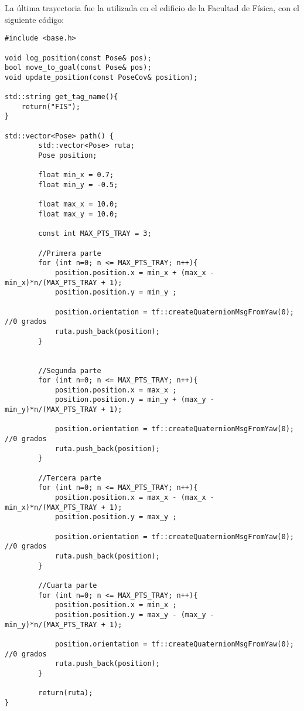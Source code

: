 La última trayectoria fue la utilizada en el edificio de la Facultad de Física, con el siguiente código:
\begin{lstlisting}
#include <base.h>

void log_position(const Pose& pos);
bool move_to_goal(const Pose& pos);
void update_position(const PoseCov& position);

std::string get_tag_name(){
    return("FIS");
}

std::vector<Pose> path() {
        std::vector<Pose> ruta;
        Pose position;

        float min_x = 0.7;
        float min_y = -0.5;

        float max_x = 10.0;
        float max_y = 10.0;

        const int MAX_PTS_TRAY = 3;

        //Primera parte
        for (int n=0; n <= MAX_PTS_TRAY; n++){
            position.position.x = min_x + (max_x - min_x)*n/(MAX_PTS_TRAY + 1);
            position.position.y = min_y ;
            
            position.orientation = tf::createQuaternionMsgFromYaw(0); //0 grados
            ruta.push_back(position);
        }


        //Segunda parte
        for (int n=0; n <= MAX_PTS_TRAY; n++){
            position.position.x = max_x ;
            position.position.y = min_y + (max_y - min_y)*n/(MAX_PTS_TRAY + 1);
            
            position.orientation = tf::createQuaternionMsgFromYaw(0); //0 grados
            ruta.push_back(position);
        }

        //Tercera parte
        for (int n=0; n <= MAX_PTS_TRAY; n++){
            position.position.x = max_x - (max_x - min_x)*n/(MAX_PTS_TRAY + 1);
            position.position.y = max_y ;
            
            position.orientation = tf::createQuaternionMsgFromYaw(0); //0 grados
            ruta.push_back(position);
        }

        //Cuarta parte
        for (int n=0; n <= MAX_PTS_TRAY; n++){
            position.position.x = min_x ;
            position.position.y = max_y - (max_y - min_y)*n/(MAX_PTS_TRAY + 1);
            
            position.orientation = tf::createQuaternionMsgFromYaw(0); //0 grados
            ruta.push_back(position);
        }

        return(ruta);
}
\end{lstlisting}
